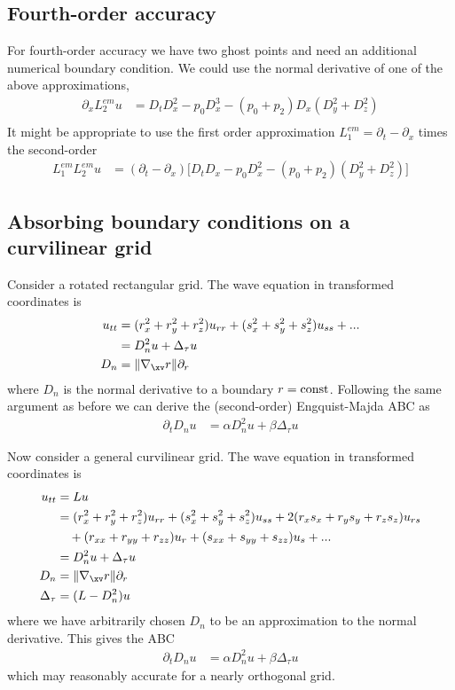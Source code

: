 \subsection{Fourth-order accuracy}

 For fourth-order accuracy we have two ghost points and need an additional numerical
boundary condition.
We could use the normal derivative of one of the above approximations,
\begin{align*}
    \partial_x L_{2}^{em}u  &= D_t D_x^2 - p_0  D_x^3 - (p_0+p_2) D_x(D_y^2+D_z^2) \\
\end{align*}
It might be appropriate to use the first order approximation $L_{1}^{em}=\partial_t -\partial_x$
times the second-order
 \begin{align*}
    L_{1}^{em} L_{2}^{em}u  &= (\partial_t -\partial_x)\Big[D_t D_x - p_0  D_x^2 - (p_0+p_2) (D_y^2+D_z^2)\Big]
\end{align*}   


\subsection{Absorbing boundary conditions on a curvilinear grid}

Consider a rotated rectangular grid. The wave equation in transformed coordinates is 
\begin{align*}
   u_{tt} &= (r_x^2 + r_y^2 + r_z^2) u_{rr} + (s_x^2 + s_y^2+s_z^2) u_{ss} + ...  \\
          &= D_n^2 u + \Delta_\tau u \\
    D_n & = \| \grad_\xv r \| \partial_r 
\end{align*}   
where $D_n$ is the normal derivative to a boundary $r={\rm const}$. 
Following the same argument as before we can derive the (second-order) Engquist-Majda ABC as
\begin{align*}
  \partial_t D_n u &= \alpha D_n^2 u + \beta \Delta_\tau u
\end{align*} 


Now consider a general curvilinear grid. 
The wave equation in transformed coordinates is 
\begin{align*}
   u_{tt} &= L u \\
          &= (r_x^2 + r_y^2 + r_z^2) u_{rr} + (s_x^2 + s_y^2+s_z^2) u_{ss}  
                       + 2(r_x s_x + r_y s_y + r_z s_z ) u_{rs} \\
          &     ~~~        + (r_{xx}+r_{yy}+r_{zz})u_r + (s_{xx}+s_{yy}+s_{zz})u_s + ... \\
          &= D_n^2 u + \Delta_\tau u \\
    D_n & = \| \grad_\xv r \| \partial_r \\
    \Delta_\tau &=  (L - D_n^2 )  u
\end{align*} 
where we have arbitrarily chosen $D_n$ to be an approximation to the normal derivative. 
This gives the ABC
\begin{align*}
  \partial_t D_n u &= \alpha D_n^2 u + \beta \Delta_\tau u
\end{align*}
which may reasonably accurate for a nearly orthogonal grid. 

